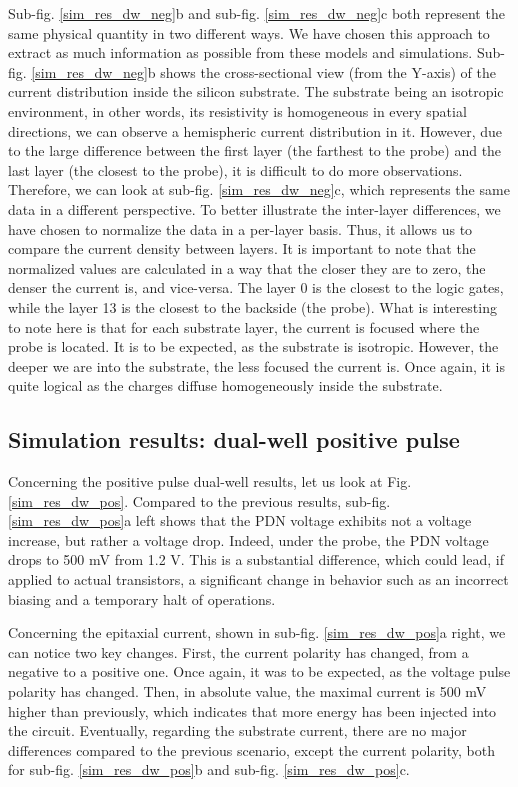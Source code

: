 		Sub-fig. \ref{sim_res_dw_neg}b and sub-fig. \ref{sim_res_dw_neg}c both represent the same physical quantity in two different ways.
		We have chosen this approach to extract as much information as possible from these models and simulations.
		Sub-fig. \ref{sim_res_dw_neg}b shows the cross-sectional view (from the Y-axis) of the current distribution inside the silicon substrate.
		The substrate being an isotropic environment, in other words, its resistivity is homogeneous in every spatial directions, we can observe a hemispheric current distribution in it.
		However, due to the large difference between the first layer (the farthest to the probe) and the last layer (the closest to the probe), it is difficult to do more observations.
		Therefore, we can look at sub-fig. \ref{sim_res_dw_neg}c, which represents the same data in a different perspective.
		To better illustrate the inter-layer differences, we have chosen to normalize the data in a per-layer basis.
		Thus, it allows us to compare the current density between layers.
		It is important to note that the normalized values are calculated in a way that the closer they are to zero, the denser the current is, and vice-versa.
		The layer 0 is the closest to the logic gates, while the layer 13 is the closest to the backside (the probe).
		What is interesting to note here is that for each substrate layer, the current is focused where the probe is located.
		It is to be expected, as the substrate is isotropic.
		However, the deeper we are into the substrate, the less focused the current is.
		Once again, it is quite logical as the charges diffuse homogeneously inside the substrate.

	\subsection{Simulation results: dual-well positive pulse}
		Concerning the positive pulse dual-well results, let us look at Fig. \ref{sim_res_dw_pos}.
		Compared to the previous results, sub-fig. \ref{sim_res_dw_pos}a left shows that the PDN voltage exhibits not a voltage increase, but rather a voltage drop.
		Indeed, under the probe, the PDN voltage drops to 500 mV from 1.2 V.
		This is a substantial difference, which could lead, if applied to actual transistors, a significant change in behavior such as an incorrect biasing and a temporary halt of operations.

		Concerning the epitaxial current, shown in sub-fig. \ref{sim_res_dw_pos}a right, we can notice two key changes.
		First, the current polarity has changed, from a negative to a positive one.
		Once again, it was to be expected, as the voltage pulse polarity has changed.
		Then, in absolute value, the maximal current is 500 mV higher than previously, which indicates that more energy has been injected into the circuit.
		Eventually, regarding the substrate current, there are no major differences compared to the previous scenario, except the current polarity, both for sub-fig. \ref{sim_res_dw_pos}b and sub-fig. \ref{sim_res_dw_pos}c.


